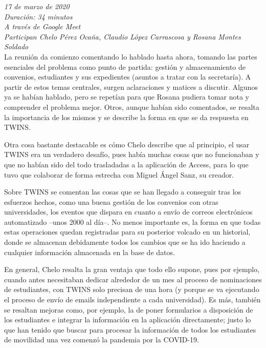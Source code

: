 \begin{appendices}
	\textit{17 de marzo de 2020}\\
	
	\textit{Duración: 34 minutos}\\
	
	\textit{A través de Google Meet}\\
	
	\textit{Participan Chelo Pérez Ocaña, Claudio López Carrascosa y Rosana Montes Soldado}\\
	
	La reunión da comienzo comentando lo hablado hasta ahora, tomando las partes esenciales del problema como punto de partida: gestión y almacenamiento de convenios, estudiantes y sus expedientes (asuntos a tratar con la secretaría). A partir de estos temas centrales, surgen aclaraciones y matices a discutir. Algunos ya se habían hablado, pero se repetían para que Rosana pudiera tomar nota y comprender el problema mejor. Otros, aunque habían sido comentados, se resalta la importancia de los mismos y se describe la forma en que se da respuesta en TWINS.
	
	Otra cosa bastante destacable es cómo Chelo describe que al principio, el usar TWINS era un verdadero desafío, pues había muchas cosas que no funcionaban y que no habían sido del todo trasladadas a la aplicación de Access, para lo que tuvo que colaborar de forma estrecha con Miguel Ángel Sanz, su creador.
	
	Sobre TWINS se comentan las cosas que se han llegado a conseguir tras los esfuerzos hechos, como una buena gestión de los convenios con otras universidades, los eventos que dispara en cuanto a envío de correos electrónicos automatizado --unos 2000 al día--. No menos importante es, la forma en que todas estas operaciones quedan registradas para su posterior volcado en un historial, donde se almacenan debidamente todos los cambios que se ha ido haciendo a cualquier información almacenada en la base de datos.
	
	En general, Chelo resalta la gran ventaja que todo ello supone, pues por ejemplo, cuando antes necesitaban dedicar alrededor de un mes al proceso de nominaciones de estudiantes, con TWINS solo precisan de una hora (y porque se va ejecutando el proceso de envío de emails independiente a cada universidad). Es más, también se resaltan mejoras como, por ejemplo, la de poner formularios a disposición de los estudiantes e integrar la información en la aplicación directamente; justo lo que han tenido que buscar para procesar la información de todos los estudiantes de movilidad una vez comenzó la pandemia por la COVID-19.
	

\end{appendices}
